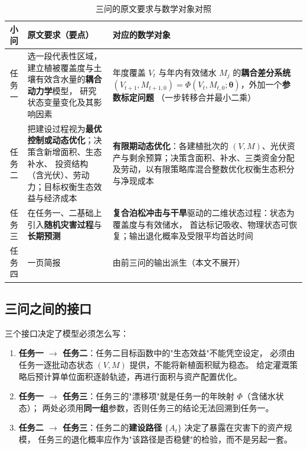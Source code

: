 \documentclass[11pt,a4paper]{ctexart}
\begin{document}
\begin{table}[H]\centering\small
\begin{tabularx}{\textwidth}{|c|X|X|}
\toprule
小问 & 原文要求（要点） & 对应的数学对象 \\
\midrule
任务一 & 选一段代表性区域，建立植被覆盖度与土壤有效含水量的\textbf{耦合动力学}模型，
研究状态变量变化及其影响因素 &
年度覆盖 $V_t$ 与年内有效储水 $M_j$ 的\textbf{耦合差分系统}
$(V_{t+1},M_{t+1,0})=\Phi(V_t,M_{t,0};\bm{\theta})$，外加一个\textbf{参数标定问题}
（一步转移合并最小二乘） \\
\addlinespace
任务二 & 把建设过程视为\textbf{最优控制或动态优化}；决策含新增面积、生态补水、
投资结构（含光伏）、劳动力；目标权衡生态效益与经济成本 &
\textbf{有限期动态优化}：各建植批次的 $(V,M)$、光伏资产与剩余预算；决策含面积、补水、三类资金分配及劳动，以有限策略库混合整数优化权衡生态积分与净现成本 \\
\addlinespace
任务三 & 在任务一、二基础上引入\textbf{随机灾害过程}与\textbf{长期预测} &
\textbf{复合泊松冲击与干旱}驱动的二维状态过程：状态为覆盖度与有效储水，
首达标记吸收、物理状态可恢复；输出退化概率及受限平均首达时间 \\
\addlinespace
任务四 & 一页简报 & 由前三问的输出派生（本文不展开） \\
\bottomrule
\end{tabularx}
\caption{三问的原文要求与数学对象对照}\label{tab:map}
\end{table}

\subsection{三问之间的接口}

三个接口决定了模型必须怎么写：

\begin{enumerate}
\item \textbf{任务一 $\to$ 任务二}：任务二目标函数中的"生态效益"不能凭空设定，
必须由任务一逐批动态状态 $(V,M)$ 提供，不能将新植面积赋为稳态。
给定灌溉策略后预计算单位面积逐龄轨迹，再进行面积与资产配置优化。
\item \textbf{任务一 $\to$ 任务三}：任务三的"漂移项"就是任务一的年映射 $\Phi$（含储水状态）；
两处必须用\textbf{同一组}参数，否则任务三的结论无法回溯到任务一。
\item \textbf{任务二 $\to$ 任务三}：任务二的\textbf{建设路径} $\{A_t\}$ 决定了暴露在灾害下的资产规模，
任务三的退化概率应作为"该路径是否稳健"的检验，而不是另起一套。
\end{enumerate}
\end{document}
